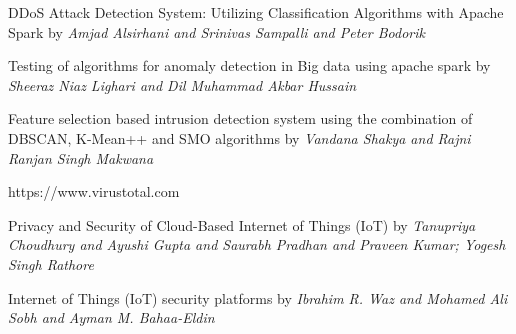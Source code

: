 \documentclass{report}
\begin{document}
\begin{thebibliography}{9}

DDoS Attack Detection System: Utilizing Classification Algorithms with Apache Spark by \textit{ Amjad Alsirhani and Srinivas Sampalli and Peter Bodorik}


Testing of algorithms for anomaly detection in Big data using apache spark by \textit{ Sheeraz Niaz Lighari and Dil Muhammad Akbar Hussain}

Feature selection based intrusion detection system using the combination of DBSCAN, K-Mean++ and SMO algorithms by \textit{ Vandana Shakya and Rajni Ranjan Singh Makwana}



https://www.virustotal.com



Privacy and Security of Cloud-Based Internet of Things (IoT) by \textit{ Tanupriya Choudhury and Ayushi Gupta and Saurabh Pradhan and Praveen Kumar; Yogesh Singh Rathore}

Internet of Things (IoT) security platforms by \textit{ Ibrahim R. Waz and Mohamed Ali Sobh and Ayman M. Bahaa-Eldin}


\end{thebibliography}
\end{document}
